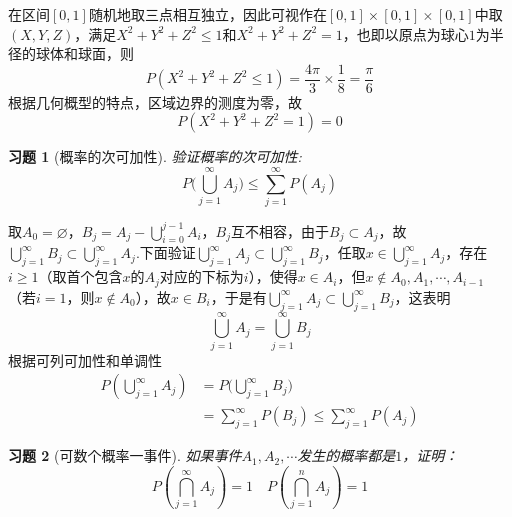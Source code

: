\documentclass[12pt,fontset=fandol]{ctexart}
\newtheorem{exercise}{习题}[section]
\begin{document}
\begin{solve}\label{a:Y1.15}
  在区间$[0,1]$随机地取三点相互独立，因此可视作在$[0,1]\times [0,1]\times [0,1]$中取$(X,Y,Z)$，满足$X^2+Y^2+Z^2\leqslant 1$和$X^2+Y^2+Z^2=1$，也即以原点为球心$1$为半径的球体和球面，则
\[
P(X^2+Y^2+Z^2\leqslant 1)=\frac{4\pi}{3}\times\frac{1}{8}=\frac{\pi}{6}
\]
根据几何概型的特点，区域边界的测度为零，故
\[
P(X^2+Y^2+Z^2=1)=0
\]  
\end{solve}

\begin{exercise}[概率的次可加性]\label{q:Y1.17}
验证概率的次可加性:
\[P(\bigcup\limits_{j = 1}^\infty  {{A_j}) \leqslant } \sum\limits_{j = 1}^\infty  {P({A_j})} \]\par{}
\end{exercise}

\begin{solve}\label{a:Y1.17}
取$A_0=\varnothing$，${B_j} = {A_j} - \bigcup\limits_{i = 0}^{j - 1} {{A_i}} $，$B_j$互不相容，由于$B_j\subset A_j$，故$ \bigcup\limits_{j = 1}^\infty  {{B_j}}  \subset \bigcup\limits_{j = 1}^\infty  {{A_j}} $.下面验证$ \bigcup\limits_{j = 1}^\infty  {{A_j}}  \subset \bigcup\limits_{j = 1}^\infty  {{B_j}} $，任取$x\in \bigcup\limits_{j = 1}^\infty  {{A_j}}$，存在$i\geqslant 1$（取首个包含$x$的$A_j$对应的下标为$i$），使得$x\in A_i$，但$x\notin A_0,A_1,\cdots,A_{i-1}$（若$i=1$，则$x\notin A_0$），故$x\in B_i$，于是有$ \bigcup\limits_{j = 1}^\infty  {{A_j}}  \subset \bigcup\limits_{j = 1}^\infty  {{B_j}} $，这表明
\[\bigcup\limits_{j = 1}^\infty  {{A_j}}  = \bigcup\limits_{j = 1}^\infty  {{B_j}}\] 根据可列可加性和单调性
\[\begin{aligned}
P(\bigcup\limits_{j = 1}^\infty  {{A_j}} ) &= P(\bigcup\limits_{j = 1}^\infty  {{B_j})}  \\&= \sum\limits_{j = 1}^\infty  {P({B_j})}  \leqslant \sum\limits_{j = 1}^\infty  {P({A_j})} 
\end{aligned}\]
\end{solve}

\begin{exercise}[可数个概率一事件]\label{q:Y1.18}
如果事件$A_1,A_2,\cdots$发生的概率都是$1$，证明：
\[P(\bigcap\limits_{j = 1}^\infty  {{A_j}} ) = 1\quad P(\bigcap\limits_{j = 1}^n {{A_j}} ) = 1\]\par{}
\end{exercise}
\end{document}
